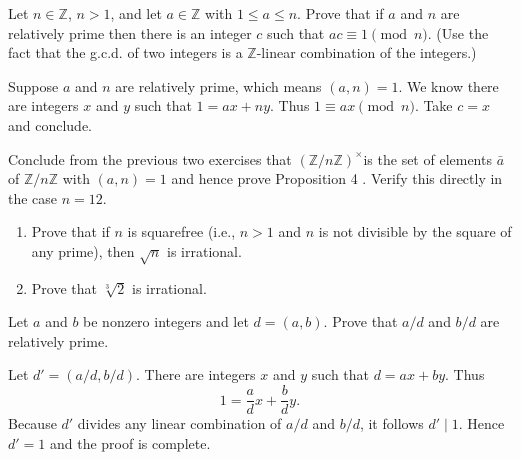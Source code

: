 \begin{questions}
\begin{solution}
\end{solution}


\question
    Let \(n \in \mathbb{Z}\), \(n>1\), and let \(a \in \mathbb{Z}\) with \(1 \leq a \leq n\). Prove that if \(a\) and \(n\) are relatively prime then there is an integer \(c\) such that \(a c \equiv 1\pmod n\). (Use the fact that the g.c.d. of two integers is a \(\mathbb{Z}\)-linear combination of the integers.)
\begin{theproof}
    Suppose \(a\) and \(n\) are relatively prime, which means \(\left( a,n \right)=1\). We know there are integers \(x\) and \(y\) such that \(1 = ax+ny\). Thus \(1 \equiv ax\pmod n\). Take \(c=x\) and conclude.
\end{theproof}


\question
    Conclude from the previous two exercises that \((\mathbb{Z} / n \mathbb{Z})^{\times}\)is the set of elements \(\bar{a}\) of \(\mathbb{Z} / n \mathbb{Z}\) with \((a, n)=1\) and hence prove Proposition 4 . Verify this directly in the case \(n=12\).




\begin{solution}
    
\end{solution}


\question
    \begin{enumerate}[label=(\alph*)]
        \item Prove that if \(n\) is squarefree (i.e., \(n>1\) and \(n\) is not divisible by the square of any prime), then \(\sqrt{n}\) is irrational.
        \item Prove that \(\sqrt[3]{2}\) is irrational.
    \end{enumerate}


\begin{solution}
    
\end{solution}


\question
Let \(a\) and \(b\) be nonzero integers and let \(d=(a, b)\). Prove that \(a / d\) and \(b / d\) are relatively prime.
\begin{theproof}
    Let \(d' = (a/d, b/d)\).
    There are integers \(x\) and \(y\) such that \(d = ax+ by\).
    Thus  \[1 = \frac{a}{d}x + \frac{b}{d}y.\] 
    Because \(d'\) divides any linear combination of \(a/d\) and \(b/d\), it follows \(d'\mid 1\). 
    Hence \(d'=1\) and the proof is complete.
\end{theproof}



\end{questions}
